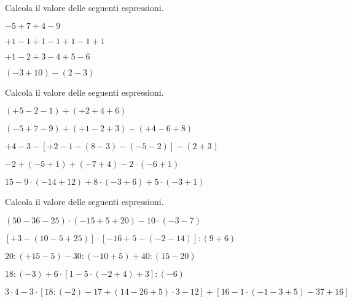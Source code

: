 \begin{esercizio}[\Ast]
Calcola il valore delle seguenti espressioni.
 \begin{multicols}{2}
 \begin{enumeratea}
 \item \(-5+7+4-9\)
 \item \(+1-1+1-1+1-1+1\)
 \item \(+1-2+3-4+5-6\)
 \item \((-3+10)-(2-3)\)
 \end{enumeratea}
 \end{multicols}
\end{esercizio}

\begin{esercizio}[\Ast]
Calcola il valore delle seguenti espressioni.
 \begin{enumeratea}
 \item \((+5-2-1)+(+2+4+6)\)
 \item \((-5+7-9)+(+1-2+3)-(+4-6+8)\)
 \item \(+4-3-[+2-1-(8-3)-(-5-2)]-(2+3)\)
 \item \(-2+(-5+1)+(-7+4)-2 \cdot (-6+1)\)
 \item \(15-9 \cdot (-14+12)+8 \cdot (-3+6)+ 5 \cdot(-3+1)\)
 \end{enumeratea}
\end{esercizio}

\begin{esercizio}[\Ast]
Calcola il valore delle seguenti espressioni.
 \begin{enumeratea}
 \item \((50-36-25)\cdot (-15+5+20)-10\cdot (-3-7)\)
 \item \([+3-(10-5+25)]\cdot [-16+5-(-2-14)]:(9+6)\)
 \item \(20:(+15-5)-30:(-10+5)+40:(15-20)\)
 \item \(18:(-3)+6\cdot [1-5\cdot (-2+4)+3]: (-6)\)
 \item \(3\cdot 4-3\cdot [18:(-2)-17+(14-26+5)\cdot 3-12]+[16-1\cdot 
(-1-3+5)-37+16]\)
\end{enumeratea}
\end{esercizio}

